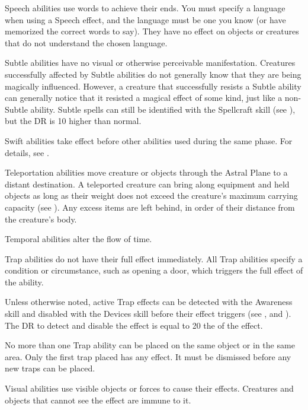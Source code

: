          Speech abilities use words to achieve their ends.
        You must specify a language when using a Speech effect, and the language must be one you know (or have memorized the correct words to say). They have no effect on objects or creatures that do not understand the chosen language.

         Subtle abilities have no visual or otherwise perceivable manifestation.
        Creatures successfully affected by Subtle abilities do not generally know that they are being magically influenced.
        However, a creature that successfully resists a Subtle ability can generally notice that it resisted a magical effect of some kind, just like a non-Subtle ability.
        Subtle spells can still be identified with the Spellcraft skill (see ), but the DR is 10 higher than normal.

         Swift abilities take effect before other abilities used during the same phase.
        For details, see .

         Teleportation abilities move creature or objects through the Astral Plane to a distant destination.
        A teleported creature can bring along equipment and held objects as long as their weight does not exceed the creature's maximum carrying capacity (see ). Any excess items are left behind, in order of their distance from the creature's body.

         Temporal abilities alter the flow of time.

         Trap abilities do not have their full effect immediately.
        All Trap abilities specify a condition or circumstance, such as opening a door, which triggers the full effect of the ability.
        \par Unless otherwise noted, active Trap effects can be detected with the Awareness skill and disabled with the Devices skill before their effect triggers (see , and ).
        The DR to detect and disable the effect is equal to 20 \add the  of the effect.
        \par No more than one Trap ability can be placed on the same object or in the same area.
        Only the first trap placed has any effect.
        It must be dismissed before any new traps can be placed.

         Visual abilities use visible objects or forces to cause their effects.
        Creatures and objects that cannot see the effect are immune to it.

